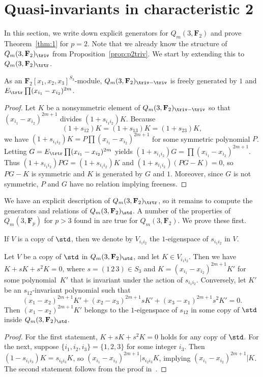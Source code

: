 \section[Quasi-invariants in characteristic 2]{Quasi-invariants in characteristic 2}\label{sec:p=2}

In this section, we write down explicit generators for $Q_m(3,\mathbf{F}_2)$ and prove Theorem~\ref{thm:1} for $p=2$. Note that we already know the structure of $Q_m(3,\mathbf{F}_2)_\triv$ from Proposition~\ref{prop:p2triv}. We start by extending this to $Q_m(3,\mathbf{F}_2)_\trtr$.

\begin{Proposition}\label{prop:trivtriv}
 As an $\mathbf{F}_2[x_1,x_2,x_3]^{S_3}$-module, $Q_m(3,\mathbf{F}_2)_{\triv-\triv}$ is freely generated by $1$ and $E_{\trtr}\prod(x_{i_1}-x_{i_2})^{2m}$.
\end{Proposition}
\begin{proof}
 Let $K$ be a nonsymmetric element of $Q_m(3,\mathbf{F}_2)_{\triv-\triv}$ so that $(x_{i_1}-x_{i_2})^{2m+1}$ divides $(1+s_{i_1i_2})K$. Because
 \[(1+s_{12})K=(1+s_{13})K=(1+s_{23})K,\]
 we have $(1+s_{i_1i_2})K = P\prod (x_{i_1}-x_{i_2})^{2m+1}$ for some symmetric polynomial $P$. Letting $G=E_{\trtr}\prod (x_{i_1}-x_{i_2})^{2m}$ yields $(1+s_{i_1i_2})G = \prod (x_{i_1}-x_{i_2})^{2m+1}$. Thus $(1+s_{i_1i_2})PG = (1+s_{i_1i_2})K$ and $(1+s_{i_1i_2})(PG-K)=0$, so $PG-K$ is symmetric and $K$ is generated by $G$ and $1$. Moreover, since $G$ is not symmetric, $P$ and $G$ have no relation implying freeness.
\end{proof}

We have an explicit description of $Q_m(3,\mathbf{F}_2)_\trtr$, so it remains to compute the generators and relations of $Q_m(3,\mathbf{F}_2)_\std$. A number of the properties of $Q_m(3,\mathbf{F}_p)$ for $p>3$ found in \cite{wang2022explicit} are true for $Q_m(3,\mathbf{F}_2)$. We prove these first.

If $V$ is a copy of $\std$, then we denote by $V_{i_1i_2}$ the $1$-eigenspace of $s_{i_1i_2}$ in $V$.

\begin{Lemma}
 Let $V$ be a copy of $\std$ in $Q_m(3,\mathbf{F}_2)_{\std}$, and let $K\in V_{i_1i_2}$. Then we have ${K+sK+s^2K}=0$, where $s=(1\,2\,3)\in S_3$ and $K=(x_{i_1}-x_{i_2})^{2m+1}K'$ for some polynomial~$K'$ that is invariant under the action of $s_{i_1i_2}$. Conversely, let $K'$ be an $s_{12}$-invariant polynomial such that
 \[(x_1-x_2)^{2m+1}K'+(x_2-x_3)^{2m+1}sK'+(x_3-x_1)^{2m+1}s^2K'=0.\]
 Then $(x_1-x_2)^{2m+1}K'$ belongs to the $1$-eigenspace of $s_{12}$ in some copy of $\std$ inside $Q_m(3,\mathbf{F}_2)_\std$.
\end{Lemma}
\begin{proof}
 For the first statement, $K+sK+s^2K=0$ holds for any copy of $\std$. For the next, suppose $\{i_1,i_2,i_3\} = \{1,2,3\}$ for some integer $i_3$. Then $(1-s_{i_1i_3})K = s_{i_2i_3}K$, so $(x_{i_1}-x_{i_3})^{2m+1}|s_{i_2i_3}K$, implying $(x_{i_1}-x_{i_2})^{2m+1}|K$.
 The second statement follows from the proof in~\cite{wang2022explicit}.
\end{proof}


